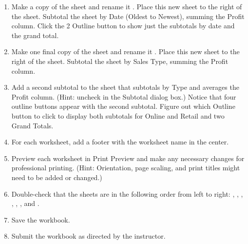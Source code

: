 \begin{enumerate}[resume]
	\item Make a copy of the  sheet and rename it . Place this new sheet to the right of the  sheet. Subtotal the sheet by Date (Oldest to Newest), summing the Profit column. Click the 2 Outline button to show just the subtotals by date and the grand total.
	\item Make one final copy of the  sheet and rename it . Place this new sheet to the right of the  sheet. Subtotal the sheet by Sales Type, summing the Profit column.
	\item Add a second subtotal to the  sheet that subtotals by Type and averages the Profit column. (Hint: uncheck  in the Subtotal dialog box.) Notice that four outline buttons appear with the second subtotal. Figure out which Outline button to click to display both subtotals for Online and Retail and two Grand Totals.
	\item For each worksheet, add a footer with the worksheet name in the center.
	\item Preview each worksheet in Print Preview and make any necessary changes for professional printing. (Hint: Orientation, page scaling, and print titles might need to be added or changed.)
	\item Double-check that the sheets are in the following order from left to right: , , , , , , and .
	\item Save the  workbook.
	\item Submit the  workbook as directed by the instructor.
\end{enumerate}
